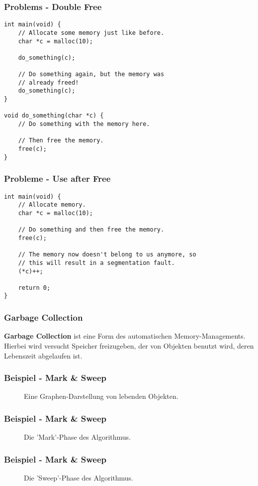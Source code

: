 \documentclass{beamer}
\begin{document}
\begin{frame}[fragile]
	\frametitle{Problems - Double Free}
	\begin{verbatim}
int main(void) {
	// Allocate some memory just like before.
	char *c = malloc(10);

	do_something(c);

	// Do something again, but the memory was
	// already freed!
	do_something(c);
}

void do_something(char *c) {
	// Do something with the memory here.

	// Then free the memory.
	free(c);
}
	\end{verbatim}
\end{frame}
\begin{frame}[fragile]
	\frametitle{Probleme - Use after Free}
	\begin{verbatim}
int main(void) {
	// Allocate memory.
	char *c = malloc(10);

	// Do something and then free the memory.
	free(c);

	// The memory now doesn't belong to us anymore, so
	// this will result in a segmentation fault.
	(*c)++;

	return 0;
}
	\end{verbatim}
\end{frame}
\begin{frame}
	\frametitle{Garbage Collection}
	\textbf{Garbage Collection} ist eine Form des automatischen Memory-Managements. Hierbei wird versucht Speicher freizugeben, der von Objekten benutzt wird, deren Lebenszeit abgelaufen ist.
\end{frame}
\begin{frame}
	\frametitle{Beispiel - Mark \& Sweep}
	\begin{figure}
		\centering
		\def\svgwidth{230pt}
		
		\caption{Eine Graphen-Darstellung von lebenden Objekten.}
	\end{figure}
\end{frame}
\begin{frame}
	\frametitle{Beispiel - Mark \& Sweep}
	\begin{figure}
		\centering
		\def\svgwidth{230pt}
		
		\caption{Die 'Mark'-Phase des Algorithmus.}
	\end{figure}
\end{frame}
\begin{frame}
	\frametitle{Beispiel - Mark \& Sweep}
	\begin{figure}
		\centering
		\def\svgwidth{230pt}
		
		\caption{Die 'Sweep'-Phase des Algorithmus.}
	\end{figure}
\end{frame}
\end{document}

